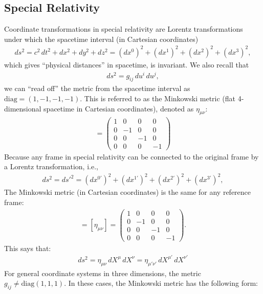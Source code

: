 \documentclass{article}
\theoremstyle{definition}
\begin{document}
\subsection{Special Relativity}
Coordinate transformations in special relativity are Lorentz transformations under which the spacetime interval (in Cartesian coordinates)
\begin{align*}
ds^2 = c^2\,dt^2 + dx^2 +dy^2+dz^2 = \left(dx^0 \right)^2 + \left(dx^1 \right)^2 + \left(dx^2 \right)^2 + \left(dx^3 \right)^2,
\end{align*}
which gives ``physical distances'' in spacetime, is invariant. We also recall that
\begin{align*}
ds^2 = g_{ij}\,du^i\,du^j,
\end{align*}
we can ``read off'' the metric from the spacetime interval as $\text{diag} = (1,-1,-1,-1)$. This is referred to as the Minkowski metric (flat 4-dimensional spacetime in Cartesian coordinates), denoted as $\eta_{\mu\nu}$:
\begin{align*}
[\eta_{\mu\nu}] = 
\begin{pmatrix}
1 & 0 & 0 & 0\\
0 & -1 & 0 & 0\\
0 & 0 & -1 & 0\\
0 & 0 & 0 & -1
\end{pmatrix}
\end{align*}
Because any frame in special relativity can be connected to the original frame by a Lorentz transformation, i.e.,
\begin{align*}
ds^2 = {ds'}^2 = \left(dx^{0'} \right)^2 + \left(dx^{1'} \right)^2  + \left(dx^{2'} \right)^2 + \left(dx^{3'} \right)^2, 
\end{align*}
The Minkowski metric (in Cartesian coordinates) is the same for any reference frame:
\begin{align*}
[\eta_{\mu'\nu'}] = [\eta_{\mu\nu}] = 
\begin{pmatrix}
1 & 0 & 0 & 0\\
0 & -1 & 0 & 0\\
0 & 0 & -1 & 0\\
0 & 0 & 0 & -1
\end{pmatrix}.
\end{align*}
This says that:
\begin{align*}
\boxed{ds^2 = \eta_{\mu\nu}\,dX^\mu\,dX^\nu = \eta_{\mu'\nu'}\,dX^{\mu'}\,dX^{\nu'}}
\end{align*}
For general coordinate systems in three dimensions, the metric $g_{ij} \neq \text{diag}(1,1,1)$. In these cases, the Minkowski metric has the following form:
\end{document}
